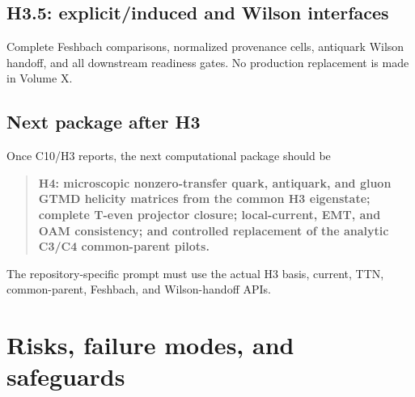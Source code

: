 \documentclass[11pt]{article}
\begin{document}
\subsection{H3.5: explicit/induced and Wilson interfaces}

Complete Feshbach comparisons, normalized provenance cells, antiquark Wilson
handoff, and all downstream readiness gates.  No production replacement is
made in Volume X.

\subsection{Next package after H3}

Once C10/H3 reports, the next computational package should be
\begin{quote}
\textbf{H4: microscopic nonzero-transfer quark, antiquark, and gluon GTMD
helicity matrices from the common H3 eigenstate; complete T-even projector
closure; local-current, EMT, and OAM consistency; and controlled replacement
of the analytic C3/C4 common-parent pilots.}
\end{quote}
The repository-specific prompt must use the actual H3 basis, current, TTN,
common-parent, Feshbach, and Wilson-handoff APIs.

\section{Risks, failure modes, and safeguards}
\label{sec:risks}
\end{document}
